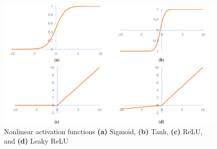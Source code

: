 \begin{figure}
    \centerline{\includegraphics[width=1\columnwidth]{03-neural-networks-in-tumor-detection/figures/nonlinear-activation-functions.png}}
    \caption{Nonlinear activation functions \textbf{(a)} Sigmoid, \textbf{(b)} Tanh, \textbf{(c)} ReLU, and \textbf{(d)} Leaky ReLU \cite{yang2018modified}}
    \label{fig:nonlinear-activation-functions}
\end{figure}
